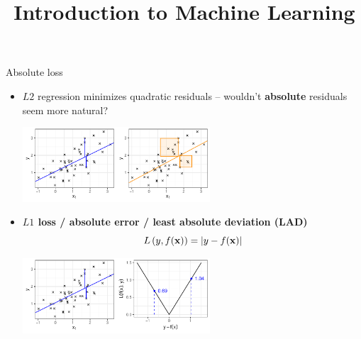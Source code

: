 \documentclass[11pt,compress,t,notes=noshow, xcolor=table]{beamer}
\title{Introduction to Machine Learning}
\begin{document}



\begin{vbframe}{Absolute loss}

\begin{itemize}
    \item $L2$ regression minimizes quadratic residuals -- wouldn't 
    \textbf{absolute} residuals seem more natural? 
    \vspace{0.2cm}
    \begin{center}
    \includegraphics[width=0.55\textwidth]{figure/reg_l1_residual_abs_vs_quad}
    \end{center}
    \item \textbf{$L1$ loss / absolute error / least absolute deviation (LAD)}
    $$L\left(y, f(\mathbf{x})\right) = |y - f(\mathbf{x})|$$
    \begin{center}
    \includegraphics[width=0.55\textwidth]{figure/reg_l1_lossplot_abs}
    \end{center}
\end{itemize}

\end{vbframe}

\end{document}

